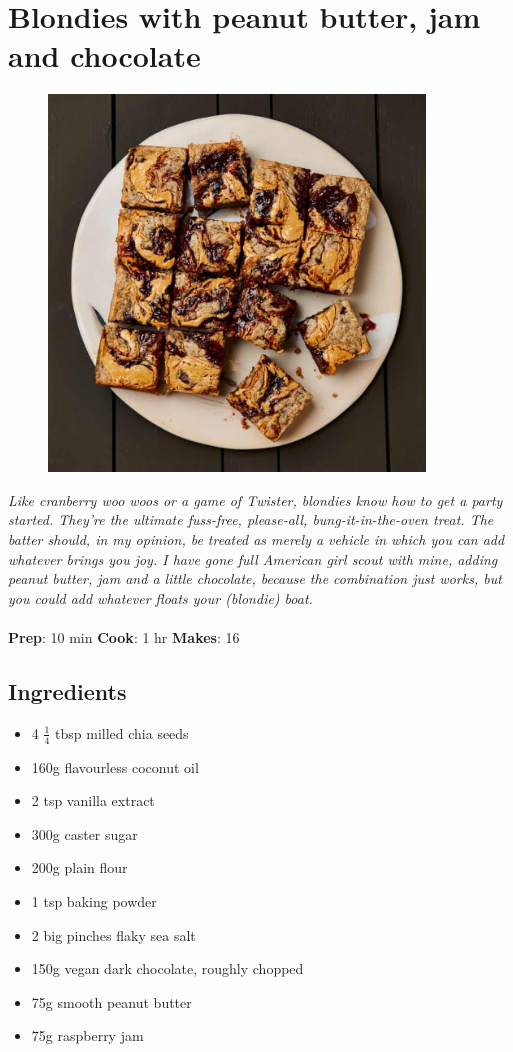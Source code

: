 \documentclass{book}
\begin{document}
\section{Blondies with peanut butter, jam and chocolate}
\begin{figure}
\centering\includegraphics[width=10cm,height=10cm,keepaspectratio]{Recipe_Pictures/Blondies_with_peanut_butter,_jam_and_chocolate.png}
\end{figure}
\emph{Like cranberry woo woos or a game of Twister, blondies know how to get a party started. They’re the ultimate fuss-free, please-all, bung-it-in-the-oven treat. The batter should, in my opinion, be treated as merely a vehicle in which you can add whatever brings you joy. I have gone full American girl scout with mine, adding peanut butter, jam and a little chocolate, because the combination just works, but you could add whatever floats your (blondie) boat.}\\\\ 
\textbf{Prep}: 10 min
\textbf{Cook}: 1 hr
\textbf{Makes}: 16
\subsection*{Ingredients}
\begin{itemize}
\item 4 $\frac{1}{4}$ tbsp milled chia seeds
\item 160g flavourless coconut oil
\item 2 tsp vanilla extract 
\item 300g caster sugar 
\item 200g plain flour
\item 1 tsp baking powder
\item 2 big pinches flaky sea salt 
\item 150g vegan dark chocolate, roughly chopped
\item 75g smooth peanut butter
\item 75g raspberry jam
\end{itemize}
\end{document}
